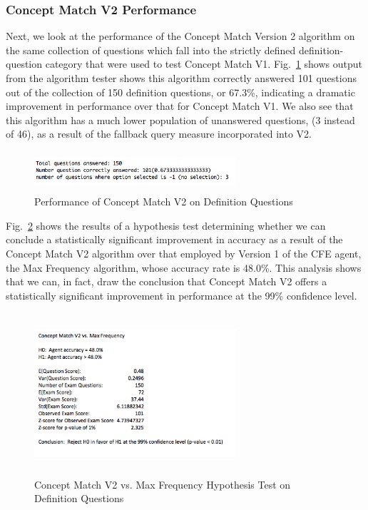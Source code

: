 \subsubsection{Concept Match V2 Performance}

Next, we look at the performance of the Concept Match Version 2 algorithm on the same collection of questions which fall into the strictly defined definition-question category that were used to test Concept Match V1.  Fig.~\ref{fig:concept_match_v2_training_set_results_def} shows output from the algorithm tester shows this algorithm correctly answered 101 questions out of the collection of 150 definition questions, or 67.3\%, indicating a dramatic improvement in performance over that for Concept Match V1.  We also see that this algorithm has a much lower population of unanswered questions, (3 instead of 46), as a result of the fallback query measure incorporated into V2.



\begin{figure}
\centering
\vspace{1.0in}
\includegraphics[width=75mm, height=15mm]{concept_match_v2_training_set_results_def.png}
\caption{Performance of Concept Match V2 on Definition Questions}
\label{fig:concept_match_v2_training_set_results_def}
\end{figure}

Fig.~\ref{fig:concept_match_v2_hypothesis_test} shows the results of a hypothesis test determining whether we can conclude a statistically significant improvement in accuracy as a result of the Concept Match V2 algorithm over that employed by Version 1 of the CFE agent, the Max Frequency algorithm, whose accuracy rate is 48.0\%.  This analysis shows that we can, in fact, draw the conclusion that Concept Match V2 offers a statistically significant improvement in performance at the 99\% confidence level.

\begin{figure}
\centering
\vspace{1.0in}
\includegraphics[width=75mm, height=60mm]{concept_match_v2_hypothesis_test.png}
\caption{Concept Match V2 vs. Max Frequency Hypothesis Test on Definition Questions}
\label{fig:concept_match_v2_hypothesis_test}
\end{figure}


